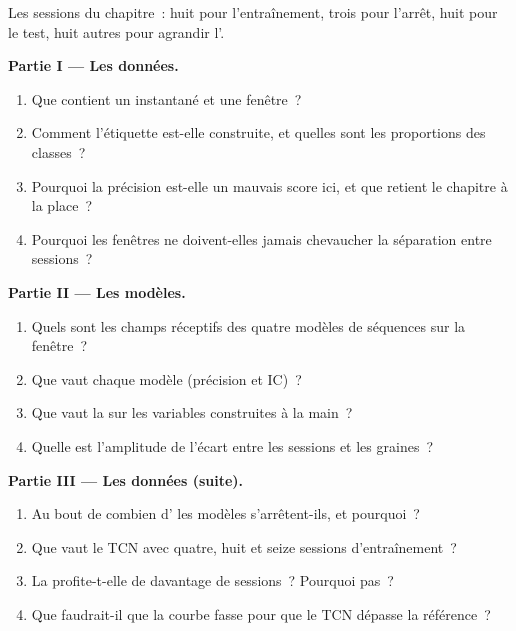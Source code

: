 \begin{problem}\label{pb:ml:sequence-models-on-order-books:1}
Les sessions du chapitre~: huit pour l'entraînement, trois pour l'arrêt, huit pour le test, huit autres pour agrandir l'.

\medskip\noindent\textbf{Partie I --- Les données.}
\begin{enumerate}
\item Que contient un instantané et une fenêtre~?
\item Comment l'étiquette est-elle construite, et quelles sont les proportions des classes~?
\item Pourquoi la précision est-elle un mauvais score ici, et que retient le chapitre à la place~?
\item Pourquoi les fenêtres ne doivent-elles jamais chevaucher la séparation entre sessions~?
\end{enumerate}

\medskip\noindent\textbf{Partie II --- Les modèles.}
\begin{enumerate}[resume]
\item Quels sont les champs réceptifs des quatre modèles de séquences sur la fenêtre~?
\item Que vaut chaque modèle (précision et IC)~?
\item Que vaut la  sur les variables construites à la main~?
\item Quelle est l'amplitude de l'écart entre les sessions et les graines~?
\end{enumerate}

\medskip\noindent\textbf{Partie III --- Les données (suite).}
\begin{enumerate}[resume]
\item Au bout de combien d' les modèles s'arrêtent-ils, et pourquoi~?
\item Que vaut le TCN avec quatre, huit et seize sessions d'entraînement~?
\item La  profite-t-elle de davantage de sessions~? Pourquoi pas~?
\item Que faudrait-il que la courbe fasse pour que le TCN dépasse la référence~?
\end{enumerate}


\end{problem}
